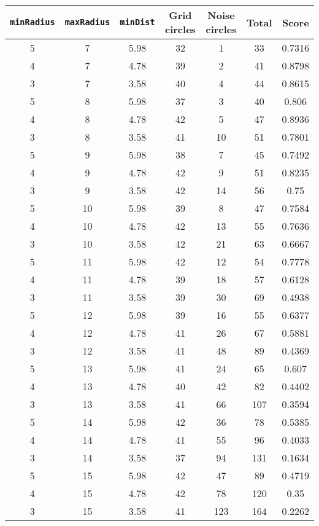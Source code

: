\documentclass[letterpaper, 12pt]{article}
\begin{document}
\begin{longtable}{|c|c|c|c|c|c|c|}
\hline
\textbf{\texttt{minRadius}} & \textbf{\texttt{maxRadius}} & \textbf{\texttt{minDist}} & \textbf{Grid circles} & \textbf{Noise circles} & \textbf{Total} & \textbf{Score} \\
\hline
5 & 7 & 5.98 & 32 & 1 & 33 & 0.7316 \\
\hline
4 & 7 & 4.78 & 39 & 2 & 41 & 0.8798 \\
\hline
3 & 7 & 3.58 & 40 & 4 & 44 & 0.8615 \\
\hline
5 & 8 & 5.98 & 37 & 3 & 40 & 0.806 \\
\hline
4 & 8 & 4.78 & 42 & 5 & 47 & 0.8936 \\
\hline
3 & 8 & 3.58 & 41 & 10 & 51 & 0.7801 \\
\hline
5 & 9 & 5.98 & 38 & 7 & 45 & 0.7492 \\
\hline
4 & 9 & 4.78 & 42 & 9 & 51 & 0.8235 \\
\hline
3 & 9 & 3.58 & 42 & 14 & 56 & 0.75 \\
\hline
5 & 10 & 5.98 & 39 & 8 & 47 & 0.7584 \\
\hline
4 & 10 & 4.78 & 42 & 13 & 55 & 0.7636 \\
\hline
3 & 10 & 3.58 & 42 & 21 & 63 & 0.6667 \\
\hline
5 & 11 & 5.98 & 42 & 12 & 54 & 0.7778 \\
\hline
4 & 11 & 4.78 & 39 & 18 & 57 & 0.6128 \\
\hline
3 & 11 & 3.58 & 39 & 30 & 69 & 0.4938 \\
\hline
5 & 12 & 5.98 & 39 & 16 & 55 & 0.6377 \\
\hline
4 & 12 & 4.78 & 41 & 26 & 67 & 0.5881 \\
\hline
3 & 12 & 3.58 & 41 & 48 & 89 & 0.4369 \\
\hline
5 & 13 & 5.98 & 41 & 24 & 65 & 0.607 \\
\hline
4 & 13 & 4.78 & 40 & 42 & 82 & 0.4402 \\
\hline
3 & 13 & 3.58 & 41 & 66 & 107 & 0.3594 \\
\hline
5 & 14 & 5.98 & 42 & 36 & 78 & 0.5385 \\
\hline
4 & 14 & 4.78 & 41 & 55 & 96 & 0.4033 \\
\hline
3 & 14 & 3.58 & 37 & 94 & 131 & 0.1634 \\
\hline
5 & 15 & 5.98 & 42 & 47 & 89 & 0.4719 \\
\hline
4 & 15 & 4.78 & 42 & 78 & 120 & 0.35 \\
\hline
3 & 15 & 3.58 & 41 & 123 & 164 & 0.2262 \\

\end{longtable}
\end{document}
